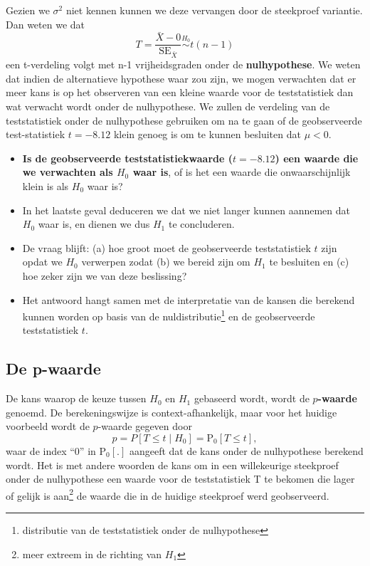 \documentclass[12pt,dutch,coursenotes]{book}
\providecommand{\tightlist}{%
  \setlength{\itemsep}{0pt}\setlength{\parskip}{0pt}}
\let\rmarkdownfootnote\footnote%
\def\footnote{\protect\rmarkdownfootnote}
\theoremstyle{definition}
\theoremstyle{definition}
\theoremstyle{definition}
\theoremstyle{remark}
\begin{document}
Gezien we \(\sigma^2\) niet kennen kunnen we deze vervangen door de
steekproef variantie. Dan weten we dat
\[T=\frac{\bar{X}-0}{\text{SE}_{\bar X}}\stackrel{H_0}{\sim} t(n-1) \]
een t-verdeling volgt met n-1 vrijheidsgraden onder de
\textbf{nulhypothese}. We weten dat indien de alternatieve hypothese
waar zou zijn, we mogen verwachten dat er meer kans is op het observeren
van een kleine waarde voor de teststatistiek dan wat verwacht wordt
onder de nulhypothese. We zullen de verdeling van de teststatistiek
onder de nulhypothese gebruiken om na te gaan of de geobserveerde
test-statistiek \(t = -8.12\) klein genoeg is om te kunnen besluiten dat
\(\mu < 0\).

\begin{itemize}
\tightlist
\item
  \textbf{Is de geobserveerde teststatistiekwaarde (\(t=-8.12\)) een
  waarde die we verwachten als \(H_0\) waar is}, of is het een waarde
  die onwaarschijnlijk klein is als \(H_0\) waar is?
\item
  In het laatste geval deduceren we dat we niet langer kunnen aannemen
  dat \(H_0\) waar is, en dienen we dus \(H_1\) te concluderen.
\item
  De vraag blijft: (a) hoe groot moet de geobserveerde teststatistiek
  \(t\) zijn opdat we \(H_0\) verwerpen zodat (b) we bereid zijn om
  \(H_1\) te besluiten en (c) hoe zeker zijn we van deze beslissing?
\item
  Het antwoord hangt samen met de interpretatie van de kansen die
  berekend kunnen worden op basis van de nuldistributie\footnote{distributie
    van de teststatistiek onder de nulhypothese} en de geobserveerde
  teststatistiek \(t\).
\end{itemize}

\subsection{De p-waarde}\label{de-p-waarde}

De kans waarop de keuze tussen \(H_0\) en \(H_1\) gebaseerd wordt, wordt
de \textbf{\(p\)-waarde} genoemd. De berekeningswijze is
context-afhankelijk, maar voor het huidige voorbeeld wordt de
\(p\)-waarde gegeven door \[
    p = P\left[T \leq t \mid H_0\right] = \text{P}_0\left[T\leq t\right],
  \] waar de index ``0'' in \(\text{P}_0\left[.\right]\) aangeeft dat de
kans onder de nulhypothese berekend wordt. Het is met andere woorden de
kans om in een willekeurige steekproef onder de nulhypothese een waarde
voor de teststatistiek T te bekomen die lager of gelijk is aan\footnote{meer
  extreem in de richting van \(H_1\)} de waarde die in de huidige
steekproef werd geobserveerd.
\end{document}
